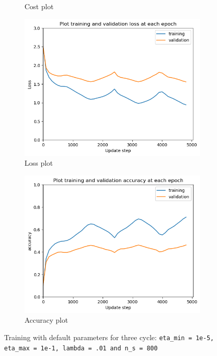 \documentclass[12pt]{article}
\newenvironment{question}[2][Question]{\begin{trivlist}
\kern10pt
\item[\hskip \labelsep {\bfseries #1}\hskip \labelsep {\bfseries #2.}]}{\end{trivlist}}
\begin{document}
\begin{question}{ii}
\begin{figure}[!htb]
\begin{subfigure}[b]{0.32\textwidth}
        \caption{Cost plot}
    \end{subfigure}
    \hfill
    \begin{subfigure}[b]{0.32\textwidth}
        \includegraphics[width=\linewidth]{f4_loss_plt.png}
        \caption{Loss plot}
    \end{subfigure}\hfill
    \begin{subfigure}[b]{0.32\textwidth}%
        \includegraphics[width=\linewidth]{f4_acc_plt.png}
        \caption{Accuracy plot}
    \end{subfigure}
    \caption{
        Training with default parameters for three cycle:
        \texttt{eta\_min = 1e-5, eta\_max = 1e-1,  lambda = .01 and n\_s = 800}
    }
    \label{fig:replicate_f4}
\end{figure}
\end{question}
\end{document}
